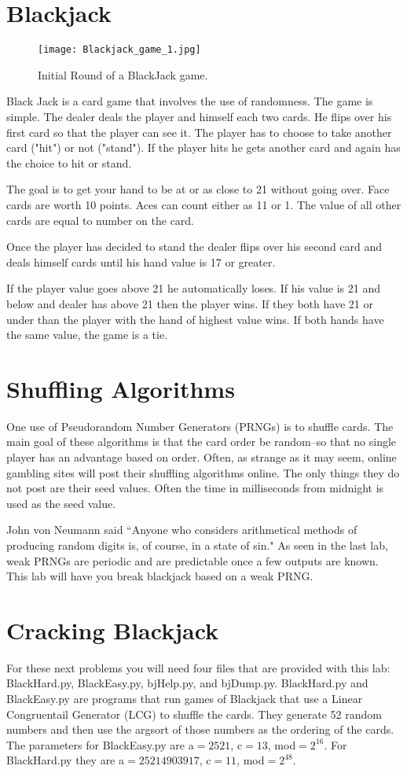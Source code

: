 \section*{Blackjack}
\begin{figure}
\texttt{[image: Blackjack\_game\_1.jpg]}
\caption{Initial Round of a BlackJack game.}
\end{figure}

Black Jack is a card game that involves the use of randomness.
The game is simple.
The dealer deals the player and himself each two cards.
He flips over his first card so that the player can see it.
The player has to choose to take another card ("hit") or not ("stand").
If the player hits he gets another card and again has the choice to hit or stand.

The goal is to get your hand to be at or as close to 21 without going over.
Face cards are worth 10 points.
Aces can count either as 11 or 1.
The value of all other cards are equal to number on the card.

Once the player has decided to stand the dealer flips over his second card and deals himself cards until his hand value is 17 or greater. 

If the player value goes above 21 he automatically loses.
If his value is 21 and below and dealer has above 21 then the player wins.
If they both have 21 or under than the player with the hand of highest value wins.
If both hands have the same value, the game is a tie.

\section*{Shuffling Algorithms}
One use of Pseudorandom Number Generators (PRNGs) is to shuffle cards.
The main goal of these algorithms is that the card order be random--so that no single player has an advantage based on order.
Often, as strange as it may seem, online gambling sites will post their shuffling algorithms online.
The only things they do not post are their seed values.
Often the time in milliseconds from midnight is used as the seed value.

John von Neumann said ``Anyone who considers arithmetical methods of producing random digits is, of course, in a state of sin."
As seen in the last lab, weak PRNGs are periodic and are predictable once a few outputs are known.
This lab will have you break blackjack based on a weak PRNG.

\section*{Cracking Blackjack}
For these next problems you will need four files that are provided with this lab: BlackHard.py, BlackEasy.py, bjHelp.py, and bjDump.py.
BlackHard.py and BlackEasy.py are programs that run games of Blackjack that use a Linear Congruentail Generator (LCG) to shuffle the cards.
They generate 52 random numbers and then use the argsort of those numbers as the ordering of the cards.
The parameters for BlackEasy.py are a$=2521$, c$=13$, mod$=2^{16}$.
For BlackHard.py they are a$=25214903917$, c$=11$, mod$=2^{48}$.

